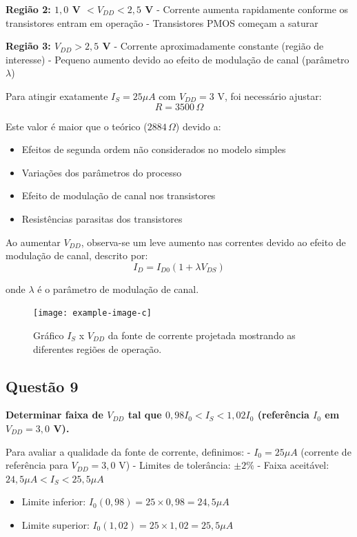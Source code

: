 ﻿\documentclass[12pt,a4paper]{article}
\begin{document}
\textbf{Região 2: $1,0$ V $< V_{DD} < 2,5$ V}
- Corrente aumenta rapidamente conforme os transistores entram em operação
- Transistores PMOS começam a saturar

\textbf{Região 3: $V_{DD} > 2,5$ V}
- Corrente aproximadamente constante (região de interesse)
- Pequeno aumento devido ao efeito de modulação de canal (parâmetro $\lambda$)



Para atingir exatamente $I_S = 25 \mu A$ com $V_{DD} = 3$ V, foi necessário ajustar:
$$R = 3500 \, \Omega$$

Este valor é maior que o teórico ($2884 \, \Omega$) devido a:
\begin{itemize}
    \item Efeitos de segunda ordem não considerados no modelo simples
    \item Variações dos parâmetros do processo
    \item Efeito de modulação de canal nos transistores
    \item Resistências parasitas dos transistores
\end{itemize}



Ao aumentar $V_{DD}$, observa-se um leve aumento nas correntes devido ao efeito de modulação de canal, descrito por:
$$I_D = I_{D0}(1 + \lambda V_{DS}) $$

onde $\lambda$ é o parâmetro de modulação de canal.

\begin{figure}[H]
    \centering
    \texttt{[image: example-image-c]}
    \caption{Gráfico $I_S$ x $V_{DD}$ da fonte de corrente projetada mostrando as diferentes regiões de operação.}
    \label{fig:is_vdd}
\end{figure}

\subsection*{Questão 9}
	\textbf{Determinar faixa de $V_{DD}$ tal que $0{,}98 I_0 < I_S < 1{,}02 I_0$ (referência $I_0$ em $V_{DD}=3{,}0$ V).}



Para avaliar a qualidade da fonte de corrente, definimos:
- $I_0 = 25 \mu A$ (corrente de referência para $V_{DD} = 3,0$ V)
- Limites de tolerância: $\pm 2\%$
- Faixa aceitável: $24,5 \mu A < I_S < 25,5 \mu A$


\begin{itemize}
    \item Limite inferior: $I_0(0,98) = 25 \times 0,98 = 24,5 \mu A$
    \item Limite superior: $I_0(1,02) = 25 \times 1,02 = 25,5 \mu A$
\end{itemize}
\end{document}
